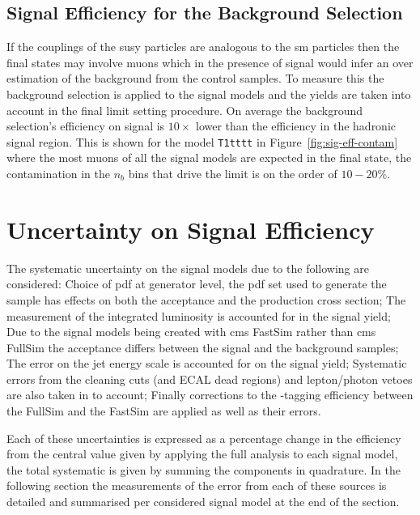 \subsection{Signal Efficiency for the Background Selection} %
\label{par:signal_efficiency_for_the_background_selection}
If the couplings of the \ac{susy} particles are analogous to the \ac{sm} 
particles then the final states may involve muons which in the presence of 
signal would infer an over estimation of the background from the control 
samples.
To measure this the background selection is applied to the signal models and 
the yields are taken into account in the final limit setting procedure. On 
average the background selection's efficiency on signal is $10\times$ lower 
than the efficiency in the hadronic signal region. This is shown for the model 
\texttt{T1tttt} in Figure~\ref{fig:sig-eff-contam} where the most muons of all 
the signal models are expected in the final state, the contamination in the 
$n_{b}$ bins that drive the limit is on the order of $10-20\%$.

\section{Uncertainty on Signal Efficiency} %
\label{sub:uncertainty_on_signal_efficiency}
The systematic uncertainty on the signal models due to the following are 
considered: Choice of \ac{pdf} at generator level, the \ac{pdf} set used to 
generate the sample has effects on both the acceptance and the production cross 
section; The measurement of the integrated luminosity is accounted for in the 
signal yield; Due to the signal models being created with \ac{cms} 
FastSim\cite{1742-6596-219-3-032053} rather than \ac{cms} 
FullSim\cite{1742-6596-331-3-032015} the acceptance differs between the signal 
and the background samples; The error on the jet energy scale is accounted for 
on the signal yield; Systematic errors from the cleaning cuts (\Rmiss and ECAL 
dead regions) and lepton/photon vetoes are also taken in to account; Finally 
corrections to the \Pbottom-tagging efficiency between the FullSim and the 
FastSim are applied as well as their errors.

Each of these uncertainties is expressed as a percentage change in the 
efficiency from the central value given by applying the full analysis to each 
signal model, the total systematic is given by summing the components in 
quadrature. In the following section the measurements of the error from each of 
these sources is detailed and summarised per considered signal model at the end 
of the section.

